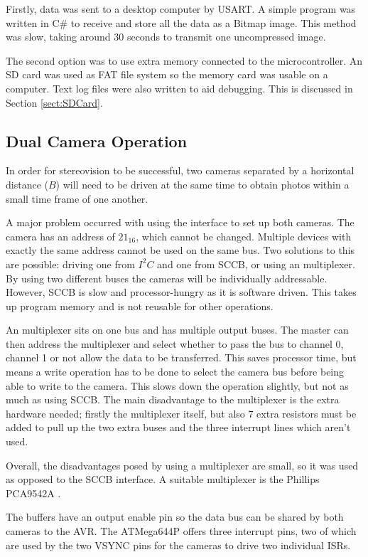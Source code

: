Firstly, data was sent to a desktop computer by USART. A simple program was written in C\# to receive and store all the data as a Bitmap image. This method was slow, taking around 30 seconds to transmit one uncompressed image. 

The second option was to use extra memory connected to the microcontroller. An SD card was used as FAT file system so the memory card was usable on a computer. Text log files were also written to aid debugging. This is discussed in Section \ref{sect:SDCard}. 

\subsection{Dual Camera Operation}
In order for stereovision to be successful, two cameras separated by a horizontal distance ($B$) will need to be driven at the same time to obtain photos within a small time frame of one another.

A major problem occurred with using the \itc interface to set up both cameras. The camera has an \itc address of $21_{16}$, which cannot be changed. Multiple \itc devices with exactly the same address cannot be used on the same bus. 
Two solutions to this are possible: driving one from $I^{2}C$ and one from SCCB, or using an \itc multiplexer. By using two different buses the cameras will be individually addressable. However, SCCB is slow and processor-hungry as it is software driven. This takes up program memory and is not reusable for other operations.

An \itc multiplexer sits on one \itc bus and has multiple output buses. The master can then address the multiplexer and select whether to pass the bus to channel 0, channel 1 or not allow the data to be transferred. This saves processor time, but means a write operation has to be done to select the camera bus before being able to write to the camera. This slows down the operation slightly, but not as much as using SCCB. The main disadvantage to the \itc multiplexer is the extra hardware needed; firstly the multiplexer itself, but also 7 extra resistors must be added to pull up the two extra buses and the three interrupt lines which aren't used.

Overall, the disadvantages posed by using a multiplexer are small, so it was used as opposed to the SCCB interface. A suitable multiplexer is the Phillips PCA9542A \citep{I2C_Mux}.

The buffers have an output enable pin so the data bus can be shared by both cameras to the AVR. The ATMega644P offers three interrupt pins, two of which are used by the two VSYNC pins for the cameras to drive two individual ISRs. 

